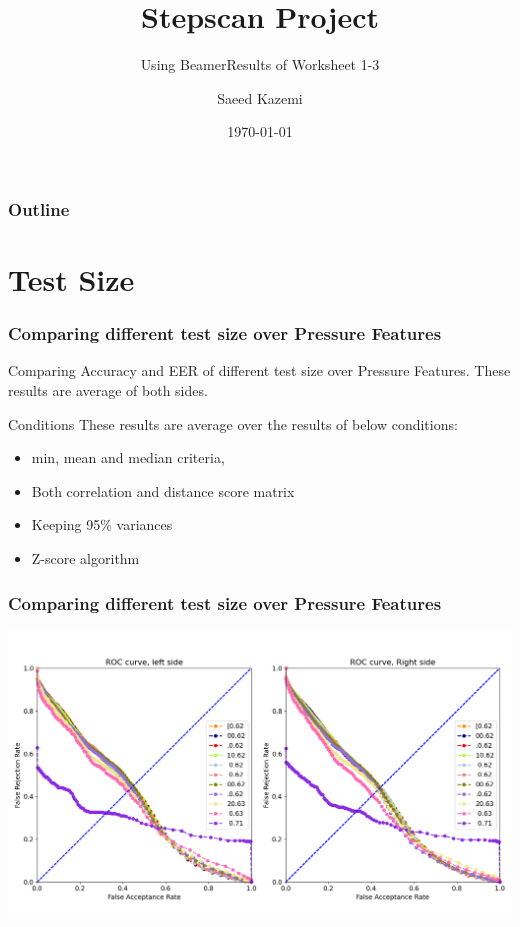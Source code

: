 \documentclass{beamer}
\subtitle{Using Beamer}
\title{ \textbf{Stepscan Project}}
\subtitle{Results of Worksheet 1-3}
\date{\today}
\author{Saeed Kazemi}
\institute{ University of New Brunswick}
\begin{document}
\begin{frame}
\titlepage
\end{frame}


\begin{frame}
\frametitle{Outline}
\tableofcontents
\end{frame}


\iffalse

\section{Test Size}
    \begin{frame}
    \frametitle{Comparing different test size over Pressure Features}
    \tiny
    \begin{table}
    \centering
    \captionsetup{labelformat=empty}
    \caption{\footnotesize Comparing Accuracy and EER of different test size over Pressure Features. These results are average of both sides.}
    
    \end{table}
    
    \begin{block}{\footnotesize Conditions}
        \tiny These results are average over the results of below conditions:
        \begin{itemize} 
            \item min, mean and median criteria,
            \item Both correlation and distance score matrix
            \item Keeping 95\% variances
            \item Z-score algorithm
        \end{itemize} 
    \end{block}
    
    \end{frame}
    
    
    
    \begin{frame}
    \centering
    \frametitle{Comparing different test size over Pressure Features}
    \includegraphics[scale=0.3]{Manuscripts/src/figures/testsize.png}
    \end{frame}
\end{document}
